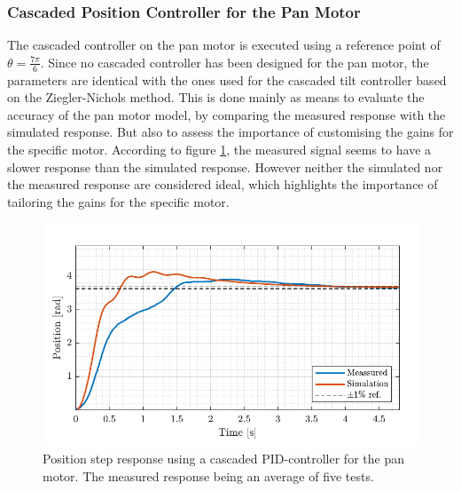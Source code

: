 \documentclass[../../main.tex]{subfiles}
\begin{document}
\subsubsection*{Cascaded Position Controller for the Pan Motor}
The cascaded controller on the pan motor is executed using a reference point of $\theta = \frac{7\pi}{6}$. Since no cascaded controller has been designed for the pan motor, the parameters are identical with the ones used for the cascaded tilt controller based on the Ziegler-Nichols method. This is done mainly as means to evaluate the accuracy of the pan motor model, by comparing the measured response with the simulated response. But also to assess the importance of customising the gains for the specific motor.
According to figure \ref{fig:cascade_ZN_pan}, the measured signal seems to have a slower response than the simulated response. However neither the simulated nor the measured response are considered ideal, which highlights the importance of tailoring the gains for the specific motor.

\begin{figure}[h]
    \centering
    \includegraphics[width = 0.7 \textwidth]{Sections/Test/Images/CascadePanTest.pdf}
    \caption{Position step response using a cascaded PID-controller for the pan motor. The measured response being an average of five tests.}
    \label{fig:cascade_ZN_pan}
\end{figure}
\end{document}

